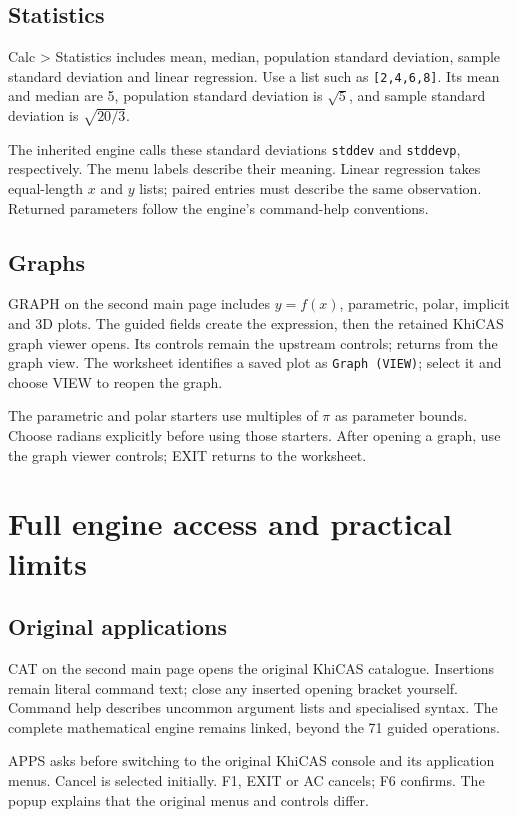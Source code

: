 \documentclass[11pt,a4paper]{article}
\newcommand{\key}[1]{\textsf{\fbox{\strut\scriptsize #1}}}
\newcommand{\menu}[1]{\textsf{\color{teal}#1}}
\begin{document}
\subsection{Statistics}
\menu{Calc > Statistics} includes mean, median, population standard deviation, sample standard deviation and linear regression. Use a list such as \texttt{[2,4,6,8]}. Its mean and median are 5, population standard deviation is $\sqrt5$, and sample standard deviation is $\sqrt{20/3}$.

The inherited engine calls these standard deviations \texttt{stddev} and \texttt{stddevp}, respectively. The menu labels describe their meaning. Linear regression takes equal-length $x$ and $y$ lists; paired entries must describe the same observation. Returned parameters follow the engine's command-help conventions.

\subsection{Graphs}
\menu{GRAPH} on the second main page includes $y=f(x)$, parametric, polar, implicit and 3D plots. The guided fields create the expression, then the retained KhiCAS graph viewer opens. Its controls remain the upstream controls; \key{EXIT} returns from the graph view. The worksheet identifies a saved plot as \texttt{Graph (VIEW)}; select it and choose VIEW to reopen the graph.

The parametric and polar starters use multiples of $\pi$ as parameter bounds. Choose radians explicitly before using those starters. After opening a graph, use the graph viewer controls; EXIT returns to the worksheet.
\clearpage

\section{Full engine access and practical limits}
\subsection{Original applications}
\menu{CAT} on the second main page opens the original KhiCAS catalogue. Insertions remain literal command text; close any inserted opening bracket yourself. Command help describes uncommon argument lists and specialised syntax. The complete mathematical engine remains linked, beyond the 71 guided operations.

\menu{APPS} asks before switching to the original KhiCAS console and its application menus. Cancel is selected initially. F1, EXIT or AC cancels; F6 confirms. The popup explains that the original menus and controls differ.
\end{document}
